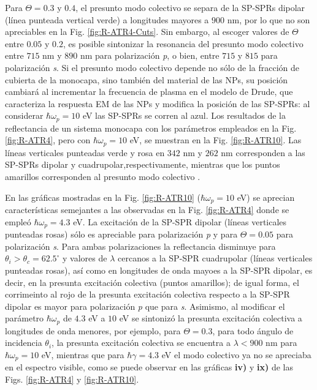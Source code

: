 Para $\Theta = 0.3$ y $0.4$, el presunto modo colectivo se separa de la SP-SPRs dipolar (línea punteada vertical verde) a longitudes mayores a $900$ nm, por lo que 
no son apreciables en la Fig. \ref{fig:R-ATR4-Cuts}. Sin embargo, al escoger valores de $\Theta$ entre $0.05$ y $0.2$, es posible sintonizar la resonancia del presunto modo colectivo entre $715$ nm y $890$ nm para polarización \emph{p}, o bien, entre $715$ y $815$ para polarización \emph{s}. Si el presunto modo colectivo depende no sólo de la fracción de cubierta de la monocapa, sino también del material de las NPs, su posición cambiará al incrementar la frecuencia de plasma en el modelo de Drude, que caracteriza la respuesta EM de las NPs y modifica la posición de las SP-SPRs: al considerar $\hbar\omega_p = 10$ eV las SP-SPRs se corren al azul. Los resultados de la reflectancia de un sistema monocapa con los parámetros empleados en la Fig. \ref{fig:R-ATR4}, pero con $\hbar\omega_p = 10$ eV, se muestran en la Fig. \ref{fig:R-ATR10}. Las líneas verticales punteadas verde y rosa en $342$ nm y $262$ nm corresponden a las SP-SPRs dipolar y cuadrupolar,respectivamente, mientras que los puntos amarillos corresponden al presunto modo colectivo .
				
	
En las gráficas mostradas en la Fig. \ref{fig:R-ATR10} ($\hbar\omega_p = 10$ eV) se aprecian características semejantes a las observadas en la Fig. \ref{fig:R-ATR4} donde se empleó $\hbar\omega_p = 4.3$ eV. La excitación de la SP-SPR dipolar (líneas verticales punteadas rosas) sólo es apreciable para polarización \emph{p} y para $\Theta = 0.05$ para polarización  \emph{s}. Para ambas polarizaciones la reflectancia disminuye para $\theta_i>\theta_c=62.5^\circ$ y valores de $\lambda$ cercanos a la SP-SPR cuadrupolar (líneas verticales punteadas rosas), así como en longitudes de onda mayoes a la SP-SPR dipolar, es decir, en la presunta excitación colectiva  (puntos amarillos); de igual forma, el corrimeinto al rojo de la presunta excitación colectiva respecto a la SP-SPR dipolar es mayor para polarización \emph{p} que para \emph{s}.  Asimismo, al modificar el parámetro $\hbar\omega_p$ de $4.3$ eV a $10$ eV se sintonizó la presunta excitación colectiva a longitudes de onda menores, por ejemplo, para $\Theta = 0.3$, para todo ángulo de incidencia $\theta_i$, la presunta excitación colectiva se encuentra a $\lambda<900$ nm para $\hbar\omega_p=10$ eV, mientras que para $\hbar\gamma=4.3$ eV el modo colectivo ya no se apreciaba en el espectro visible, como se puede observar en las gráficas \textbf{iv)} y \textbf{ix)} de las Figs. \ref{fig:R-ATR4} y \ref{fig:R-ATR10}.

